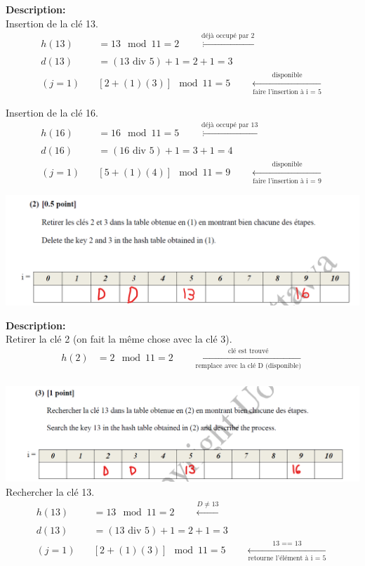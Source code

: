 \documentclass[12pt]{book}
\begin{document}
\begin{enumerate}
    \textbf{Description:}\\
    Insertion de la clé 13.
    \begin{align*}
        h(13) &= 13 \mod 11 = 2 \qquad \xleftarrow[]{\text{déjà occupé par 2}}\\
        d(13) &= (13 \text{ div } 5) + 1 = 2 + 1 = 3\\
        (j = 1) \quad &[2 + (1)(3)]\mod 11 = 5 \qquad \xleftarrow[\text{faire l'insertion à i = 5}]{\text{disponible}}
    \end{align*}
    
    Insertion de la clé 16.
    \begin{align*}
        h(16) &= 16 \mod 11 = 5 \qquad \xleftarrow[]{\text{déjà occupé par 13}}\\
        d(16) &= (16 \text{ div } 5) + 1 = 3 + 1 = 4\\
        (j = 1) \quad &[5 + (1)(4)]\mod 11 = 9 \qquad \xleftarrow[\text{faire l'insertion à i = 9}]{\text{disponible}}
    \end{align*}
    
    \includegraphics[scale=0.50]{d7q3a2.png}
    
    \textbf{Description:}\\
    Retirer la clé 2 (on fait la même chose avec la clé 3).
    \begin{align*}
        h(2) &= 2 \mod 11 = 2 \qquad \xleftarrow[\text{remplace avec la clé D (disponible)}]{\text{clé est trouvé}}\\
    \end{align*}
    
    \includegraphics[scale=0.60]{d7q3a3.png}\\
    Rechercher la clé 13.
    \begin{align*}
        h(13) &= 13 \mod 11 = 2 \qquad \xleftarrow[]{D \neq 13}\\
        d(13) &= (13 \text{ div } 5) + 1 = 2 + 1 = 3\\
        (j = 1) \quad &[2 + (1)(3)]\mod 11 = 5 \qquad \xleftarrow[\text{retourne l'élément à i = 5}]{\text{13 == 13}}
    \end{align*}
    

\end{enumerate}
\end{document}

